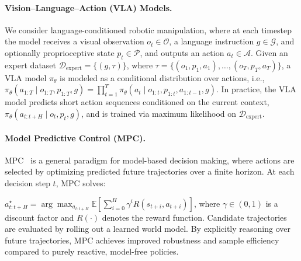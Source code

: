
\paragraph{Vision--Language--Action (VLA) Models.}

We consider language-conditioned robotic manipulation, where at each timestep the model receives a visual observation $o_t \in \mathcal{O}$, a language instruction $g \in \mathcal{G}$, and optionally proprioceptive state $p_t \in \mathcal{P}$, and outputs an action $a_t \in \mathcal{A}$. Given an expert dataset $\mathcal{D}_{\text{expert}} = \{(g, \tau)\}$, where $\tau = \{(o_1, p_1, a_1), \dots, (o_T, p_T, a_T)\}$, a VLA model $\pi_\theta$ is modeled as a conditional distribution over actions, i.e., $\pi_\theta(a_{1:T} \mid o_{1:T}, p_{1:T}, g) = \prod_{t=1}^{T} \pi_\theta(a_t \mid o_{1:t}, p_{1:t}, a_{1:t-1}, g)$. In practice, the VLA model predicts short action sequences conditioned on the current context, $\pi_\theta(a_{t:t+H} \mid o_t, p_t, g)$, and is trained via maximum likelihood on $\mathcal{D}_{\text{expert}}$.

\paragraph{Model Predictive Control (MPC).}
MPC~\citep{garcia1989model} is a general paradigm for model-based decision making, where actions are selected by optimizing predicted future trajectories over a finite horizon.
At each decision step $t$, MPC solves:

\(
\textstyle
a_{t:t+H}^\star
=
\arg\max_{a_{t:t+H}}
\mathbb{E}
\left[
\sum_{i=0}^{H}
\gamma^{i}
R(s_{t+i}, a_{t+i})
\right]
\),
where $\gamma \in (0,1)$ is a discount factor and $R(\cdot)$ denotes the reward function.
Candidate trajectories are evaluated by rolling out a learned world model.
By explicitly reasoning over future trajectories, MPC achieves improved robustness and sample efficiency compared to purely reactive, model-free policies.

